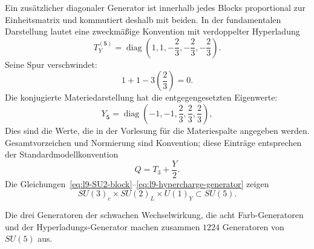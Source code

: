 Ein zusätzlicher diagonaler Generator ist innerhalb jedes Blocks proportional zur Einheitsmatrix und kommutiert deshalb mit beiden. In der fundamentalen Darstellung lautet eine zweckmäßige Konvention mit verdoppelter Hyperladung
\begin{equation}
T_Y^{(\mathbf5)}=
\operatorname{diag}
\left(
1,1,-\frac23,-\frac23,-\frac23
\right).
\label{eq:l9-hypercharge-generator}
\end{equation}
Seine Spur verschwindet:
\begin{equation}
1+1-3\left(\frac23\right)=0.
\end{equation}
Die konjugierte Materiedarstellung hat die entgegengesetzten Eigenwerte:
\begin{equation}
Y_{\overline{\mathbf5}}
=
\operatorname{diag}
\left(
-1,-1,\frac23,\frac23,\frac23
\right),
\label{eq:l9-fivebar-hypercharge}
\end{equation}
Dies sind die Werte, die in der Vorlesung für die Materiespalte angegeben werden. Gesamtvorzeichen und Normierung sind Konvention; diese Einträge entsprechen der Standardmodellkonvention
\begin{equation}
Q=T_3+\frac{Y}{2}.
\label{eq:l9-charge}
\end{equation}
Die Gleichungen~\eqref{eq:l9-SU2-block}--\eqref{eq:l9-hypercharge-generator} zeigen
\begin{equation}
SU(3)_c\times SU(2)_L\times U(1)_Y
\subset SU(5).
\end{equation}

Die drei Generatoren der schwachen Wechselwirkung, die acht Farb-Generatoren und der Hyperladungs-Generator machen zusammen \(12\)\(24\) Generatoren von \(SU(5)\) aus.

\begin{classroomqa}
\end{classroomqa}

